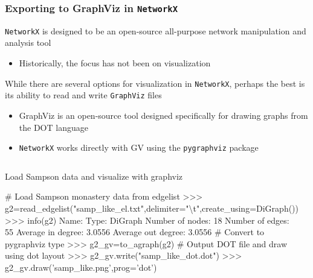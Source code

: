\documentclass[xcolor=dvipsnames, 9pt]{beamer}
\newenvironment{code}{\begin{semiverbatim} \begin{footnotesize}}
{\end{footnotesize}\end{semiverbatim}}
\begin{document}
\begin{frame}[fragile]
    \frametitle{Exporting to GraphViz in \texttt{NetworkX}}
    \texttt{NetworkX} is designed to be an open-source all-purpose network manipulation and analysis tool
    \begin{itemize}
        \item Historically, the focus has not been on visualization
    \end{itemize}
    While there are several options for visualization in \texttt{NetworkX}, perhaps the best is its ability to read and write \texttt{GraphViz} files
    \begin{itemize}
        \item GraphViz is an open-source tool designed specifically for drawing graphs from the DOT language
        \item \texttt{NetworkX} works directly with GV using the \texttt{pygraphviz} package
    \end{itemize}
    \begin{columns}
        \begin{block}{\scriptsize{Load Sampson data and visualize with graphviz}}
            \begin{code}
\tiny{\alert<2>{# Load Sampson monastery data from edgelist
>>> g2=read_edgelist("samp_like_el.txt",delimiter="\textbackslash t",create_using=DiGraph())
>>> info(g2)
Name:                  
Type:                  DiGraph
Number of nodes:       18
Number of edges:       55
Average in degree:     3.0556
Average out degree:    3.0556}
\alert<3>{# Convert to pygraphviz type
>>> g2_gv=to_agraph(g2)}
\alert<4>{# Output DOT file and draw using dot layout
>>> g2_gv.write("samp_like_dot.dot")
>>> g2_gv.draw('samp_like.png',prog='dot')}}
            \end{code}
        \end{block}
        \begin{center}
        \end{center}
    \end{columns}
\end{frame}
\end{document}
